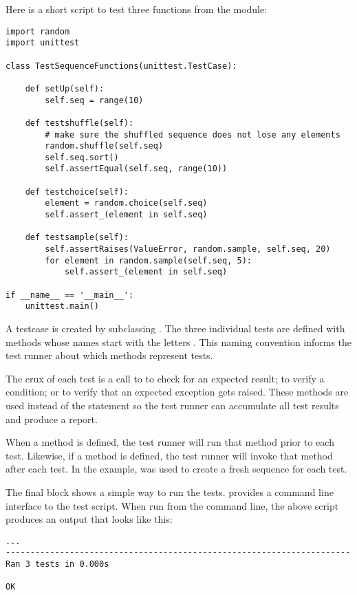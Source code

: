 Here is a short script to test three functions from the
 module:

\begin{verbatim}
import random
import unittest

class TestSequenceFunctions(unittest.TestCase):
    
    def setUp(self):
        self.seq = range(10)

    def testshuffle(self):
        # make sure the shuffled sequence does not lose any elements
        random.shuffle(self.seq)
        self.seq.sort()
        self.assertEqual(self.seq, range(10))

    def testchoice(self):
        element = random.choice(self.seq)
        self.assert_(element in self.seq)

    def testsample(self):
        self.assertRaises(ValueError, random.sample, self.seq, 20)
        for element in random.sample(self.seq, 5):
            self.assert_(element in self.seq)

if __name__ == '__main__':
    unittest.main()
\end{verbatim}

A testcase is created by subclassing .
The three individual tests are defined with methods whose names start with
the letters .  This naming convention informs the test runner
about which methods represent tests.

The crux of each test is a call to  to
check for an expected result;  to verify a condition;
or  to verify that an expected exception gets
raised.  These methods are used instead of the  statement
so the test runner can accumulate all test results and produce a report.

When a  method is defined, the test runner will run that
method prior to each test.  Likewise, if a  method is
defined, the test runner will invoke that method after each test.  In the
example,  was used to create a fresh sequence for each test.

The final block shows a simple way to run the tests.
 provides a command line interface to the
test script.  When run from the command line, the above script
produces an output that looks like this:

\begin{verbatim}
...
----------------------------------------------------------------------
Ran 3 tests in 0.000s

OK
\end{verbatim}

